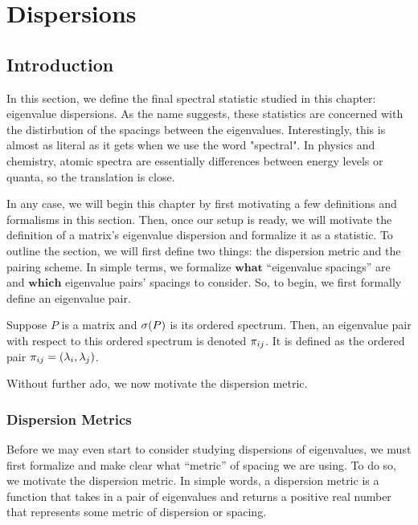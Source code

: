 
\chapter{Dispersions}

\section{Introduction}

In this section, we define the final spectral statistic studied in this chapter: eigenvalue dispersions. As the name suggests, these statistics are concerned with the distirbution of the spacings between the eigenvalues. Interestingly, this is almost as literal as it gets when we use the word "spectral". In physics and chemistry, atomic spectra are essentially differences between energy levels or quanta, so the translation is close.

In any case, we will begin this chapter by first motivating a few definitions and formalisms in this section. Then, once our setup is ready, we will motivate the definition of a matrix's eigenvalue dispersion and formalize it as a statistic. To outline the section, we will first define two things: the dispersion metric and the pairing scheme. In simple terms, we formalize $\textbf{what}$ ``eigenvalue spacings'' are and $\textbf{which}$ eigenvalue pairs' spacings to consider. So, to begin, we first formally define an eigenvalue pair.

\begin{definition}
  Suppose $P$ is a matrix and $\sigma(P)$ is its ordered spectrum. Then, an eigenvalue pair with respect to this ordered spectrum is denoted ${\pi_{ij}}$. It is defined as the ordered pair ${\pi_{ij}} = (\lambda_i, \lambda_j)$.
\end{definition}

\noindent Without further ado, we now motivate the dispersion metric.


\subsection{Dispersion Metrics}

Before we may even start to consider studying dispersions of eigenvalues, we must first formalize and make clear what ``metric'' of spacing we are using. To do so, we motivate the dispersion metric. In simple words, a dispersion metric is a function that takes in a pair of eigenvalues and returns a positive real number that represents some metric of dispersion or spacing.


